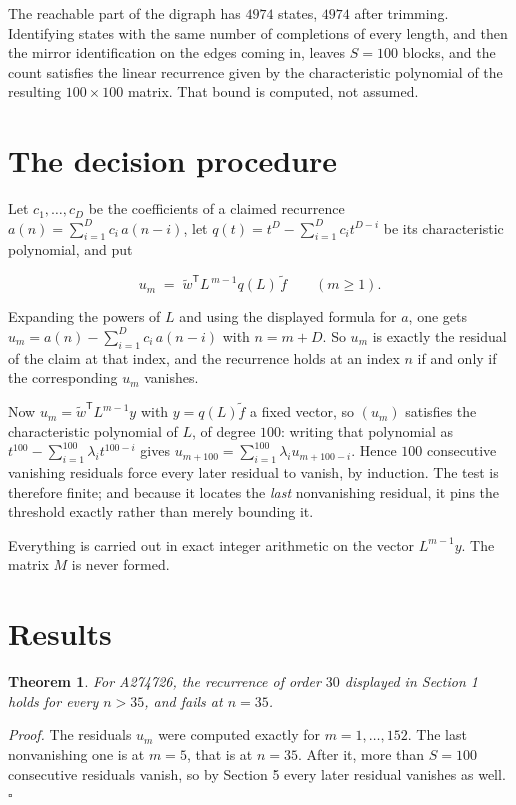 \documentclass[11pt]{article}
\newtheorem{theorem}{Theorem}
\theoremstyle{definition}
\begin{document}
The reachable part of the digraph has $4974$ states, $4974$ after trimming. Identifying states with the same number of completions of every length, and then the mirror identification on the edges coming in, leaves $S = 100$ blocks, and the count satisfies the linear recurrence given by the characteristic polynomial of the resulting $100\times100$ matrix. That bound is computed, not assumed.

\section{The decision procedure}

Let $c_1,\dots,c_D$ be the coefficients of a claimed recurrence $a(n) = \sum_{i=1}^{D} c_i\,a(n-i)$, let $q(t) = t^{D} - \sum_{i=1}^{D} c_i t^{D-i}$ be its characteristic polynomial, and put

\[u_m \;=\; \tilde w^{\mathsf T} L^{\,m-1} q(L)\,\tilde f \qquad (m \ge 1).\]

Expanding the powers of $L$ and using the displayed formula for $a$, one gets $u_m = a(n) - \sum_{i=1}^{D} c_i\,a(n-i)$ with $n = m + D$. So $u_m$ is exactly the residual of the claim at that index, and the recurrence holds at an index $n$ if and only if the corresponding $u_m$ vanishes.

Now $u_m = \tilde w^{\mathsf T} L^{m-1} y$ with $y = q(L)\tilde f$ a fixed vector, so $(u_m)$ satisfies the characteristic polynomial of $L$, of degree $100$: writing that polynomial as $t^{100} - \sum_{i=1}^{100} \lambda_i t^{100-i}$ gives $u_{m+100} = \sum_{i=1}^{100} \lambda_i u_{m+100-i}$. Hence $100$ consecutive vanishing residuals force every later residual to vanish, by induction. The test is therefore finite; and because it locates the {\itshape last} nonvanishing residual, it pins the threshold exactly rather than merely bounding it.

Everything is carried out in exact integer arithmetic on the vector $L^{m-1}y$. The matrix $M$ is never formed.

\section{Results}

\begin{theorem} For A274726, the recurrence of order $30$ displayed in Section 1 holds for every $n > 35$, and fails at $n = 35$.\end{theorem}

{\itshape Proof.} The residuals $u_m$ were computed exactly for $m = 1,\dots,152$. The last nonvanishing one is at $m = 5$, that is at $n = 35$. After it, more than $S = 100$ consecutive residuals vanish, so by Section 5 every later residual vanishes as well. $\square$
\end{document}
